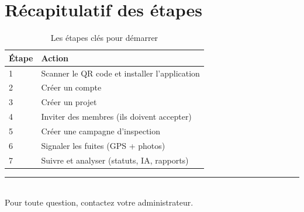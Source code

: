 \documentclass[11pt,a4paper]{article}
\begin{document}
\section{Récapitulatif des étapes}

\begin{table}[H]
\centering
\begin{tabular}{@{}ll@{}}
\toprule
\textbf{Étape} & \textbf{Action} \\
\midrule
1 & Scanner le QR code et installer l'application \\
2 & Créer un compte \\
3 & Créer un projet \\
4 & Inviter des membres (ils doivent accepter) \\
5 & Créer une campagne d'inspection \\
6 & Signaler les fuites (GPS + photos) \\
7 & Suivre et analyser (statuts, IA, rapports) \\
\bottomrule
\end{tabular}
\caption{Les étapes clés pour démarrer}
\end{table}

\vspace{0.5cm}

\begin{center}
\rule{0.5\textwidth}{1pt}\\[0.3cm]
{\small\textcolor{gris}{Pour toute question, contactez votre administrateur.}}
\end{center}
\end{document}
